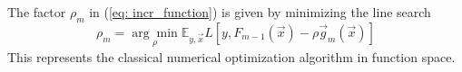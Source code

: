 \documentclass[12pt, a4paper]{article}
\begin{document}
The factor $\rho_m$ in (\ref{eq: incr_function}) is given by minimizing the line search
\begin{equation}
    \rho_m = \underset{\rho}{\arg\min} \mathbb{E}_{y,\vec{x}} L[y,F_{m-1}(\vec{x}) - \rho \vec{g}_m(\vec{x})]
\end{equation}
This represents the classical numerical optimization algorithm in function space.

\end{document}
